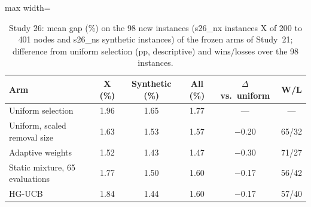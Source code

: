 \begin{table}[t]
\caption{Study 26: mean gap (\%) on the 98 new instances (\num{s26_nx} instances X of 200 to 401 nodes and \num{s26_ns} synthetic instances) of the frozen arms of Study~21; difference from uniform selection (pp, descriptive) and wins/losses over the 98 instances.}\label{tab:s26a}
\centering
\small
\begin{adjustbox}{max width=\linewidth}
\begin{tabular}{lccccc}
\toprule
Arm & X (\%) & Synthetic (\%) & All (\%) & $\Delta$ vs.\ uniform & W/L \\
\midrule
Uniform selection & 1.96 & 1.65 & 1.77 & --- & --- \\
Uniform, scaled removal size & 1.63 & 1.53 & 1.57 & $-$0.20 & 65/32 \\
Adaptive weights & 1.52 & 1.43 & 1.47 & $-$0.30 & 71/27 \\
Static mixture, 65 evaluations & 1.77 & 1.50 & 1.60 & $-$0.17 & 56/42 \\
HG-UCB & 1.84 & 1.44 & 1.60 & $-$0.17 & 57/40 \\
\bottomrule
\end{tabular}
\end{adjustbox}
\end{table}
